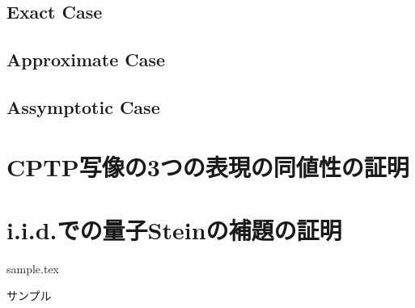 \documentclass[report]{jlreq}
\begin{document}
\section{Exact Case}
\section{Approximate Case}
\section{Assymptotic Case}

\appendix
\chapter{CPTP写像の3つの表現の同値性の証明}
\chapter{i.i.d.での量子Steinの補題の証明}



{sample.tex}
  
\begin{thebibliography}{99}
    サンプル
\end{thebibliography}
  
\end{document}
